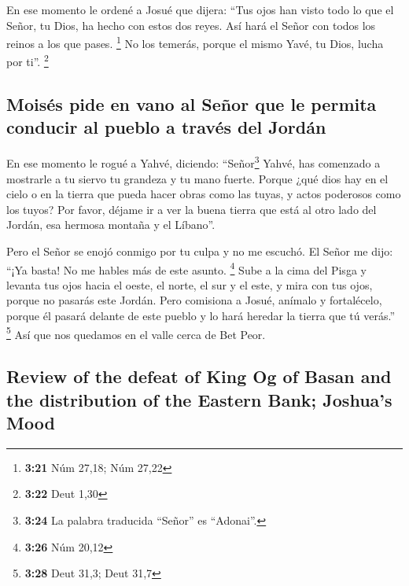 \begin{paracol}{2}
 En ese momento le ordené a Josué que dijera: ``Tus ojos
han visto todo lo que el Señor, tu Dios, ha hecho con estos dos reyes.
Así hará el Señor con todos los reinos a los que pases. \footnote{\textbf{3:21}
  Núm 27,18; Núm 27,22}  No los temerás, porque el mismo
Yavé, tu Dios, lucha por ti''. \footnote{\textbf{3:22} Deut 1,30}

\hypertarget{moisuxe9s-pide-en-vano-al-seuxf1or-que-le-permita-conducir-al-pueblo-a-travuxe9s-del-jorduxe1n}{%
\subsection{Moisés pide en vano al Señor que le permita conducir al
pueblo a través del
Jordán}\label{moisuxe9s-pide-en-vano-al-seuxf1or-que-le-permita-conducir-al-pueblo-a-travuxe9s-del-jorduxe1n}}

 En ese momento le rogué a Yahvé, diciendo:
 ``Señor\footnote{\textbf{3:24} La palabra traducida
  ``Señor'' es ``Adonai''.} Yahvé, has comenzado a mostrarle a tu siervo
tu grandeza y tu mano fuerte. Porque ¿qué dios hay en el cielo o en la
tierra que pueda hacer obras como las tuyas, y actos poderosos como los
tuyos?  Por favor, déjame ir a ver la buena tierra que
está al otro lado del Jordán, esa hermosa montaña y el Líbano''.

 Pero el Señor se enojó conmigo por tu culpa y no me
escuchó. El Señor me dijo: ``¡Ya basta! No me hables más de este asunto.
\footnote{\textbf{3:26} Núm 20,12}  Sube a la cima del
Pisga y levanta tus ojos hacia el oeste, el norte, el sur y el este, y
mira con tus ojos, porque no pasarás este Jordán.  Pero
comisiona a Josué, anímalo y fortalécelo, porque él pasará delante de
este pueblo y lo hará heredar la tierra que tú verás.'' \footnote{\textbf{3:28}
  Deut 31,3; Deut 31,7}  Así que nos quedamos en el valle
cerca de Bet Peor.

\switchcolumn
\begin{otherlanguage}{english}

\hypertarget{review-of-the-defeat-of-king-og-of-basan-and-the-distribution-of-the-eastern-bank-joshuas-mood}{%
\subsection{Review of the defeat of King Og of Basan and the
distribution of the Eastern Bank; Joshua's
Mood}\label{review-of-the-defeat-of-king-og-of-basan-and-the-distribution-of-the-eastern-bank-joshuas-mood}}


\end{otherlanguage}
\end{paracol}

